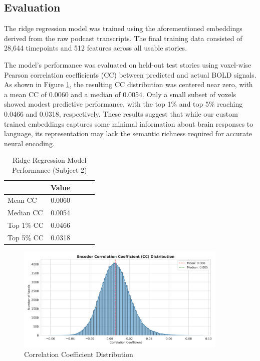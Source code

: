 \documentclass[11pt,letterpaper]{article}
\begin{document}
\vspace{1em} %
\subsection{Evaluation}
\vspace{0.5em} %
The ridge regression model was trained using the aforementioned embeddings derived from the raw podcast transcripts.  The final training data consisted of 28,644 timepoints and 512 features across all usable stories.

The model's performance was evaluated on held-out test stories using voxel-wise Pearson correlation coefficients (CC) between predicted and actual BOLD signals. As shown in Figure \ref{fig:prob_hist_custom}, the resulting CC distribution was centered near zero, with a mean CC of 0.0060 and a median of 0.0054. Only a small subset of voxels showed modest predictive performance, with the top 1\% and top 5\% reaching 0.0466 and 0.0318, respectively. These results suggest that while our custom trained embeddings captures some minimal information about brain responses to language, its representation may lack the semantic richness required for accurate neural encoding.

\begin{table}[H]
\centering
\begin{tabular}{lcccc}
\toprule
\textbf{} & \textbf{Value} \\
\midrule
Mean CC    & 0.0060 \\
Median CC  & 0.0054 \\
Top 1\% CC & 0.0466 \\
Top 5\% CC & 0.0318 \\
\bottomrule
\end{tabular}
\caption{Ridge Regression Model Performance (Subject 2)}
\label{tab:custom_cc_results}
\end{table}

\begin{figure}[ht]
    \centering
    \includegraphics[width=0.9\textwidth]{figs/cc_distribution__trained_encoder_subject2.png}
    \caption{Correlation Coefficient Distribution}
    \label{fig:prob_hist_custom}
\end{figure}
\end{document}
